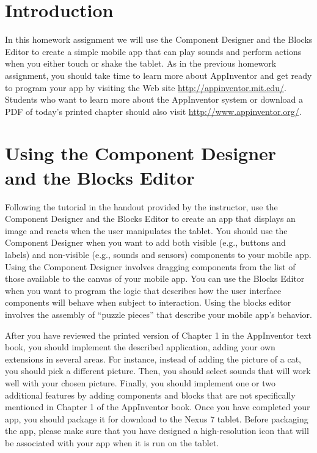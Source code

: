 	

\usepackage[compact]{titlesec}



\vspace*{-.1in}
\section*{Introduction}

In this homework assignment we will use the Component Designer and the Blocks Editor to create a simple mobile app that
can play sounds and perform actions when you either touch or shake the tablet.  As in the previous homework assignment,
you should take time to learn more about AppInventor and get ready to program your app by visiting the Web site
\url{http://appinventor.mit.edu/}. Students who want to learn more about the AppInventor system or download a PDF of
today's printed chapter should also visit \url{http://www.appinventor.org/}.

\section*{Using the Component Designer and the Blocks Editor}

Following the tutorial in the handout provided by the instructor, use the Component Designer and the Blocks Editor
to create an app that displays an image and reacts when the user manipulates the tablet.  You should use the Component
Designer when you want to add both visible (e.g., buttons and labels) and non-visible (e.g., sounds and sensors)
components to your mobile app.  Using the Component Designer involves dragging components from the list of those
available to the canvas of your mobile app.  You can use the Blocks Editor when you want to program the logic that
describes how the user interface components will behave when subject to interaction. Using the blocks editor involves
the assembly of ``puzzle pieces'' that describe your mobile app's behavior.

After you have reviewed the printed version of Chapter 1 in the AppInventor text book, you should implement the
described application, adding your own extensions in several areas.  For instance, instead of adding the picture of a
cat, you should pick a different picture.  Then, you should select sounds that will work well with your chosen picture.
Finally, you should implement one or two additional features by adding components and blocks that are not specifically
mentioned in Chapter 1 of the AppInventor book. Once you have completed your app, you should package it for download to
the Nexus 7 tablet.  Before packaging the app, please make sure that you have designed a high-resolution icon that will
be associated with your app when it is run on the tablet.

